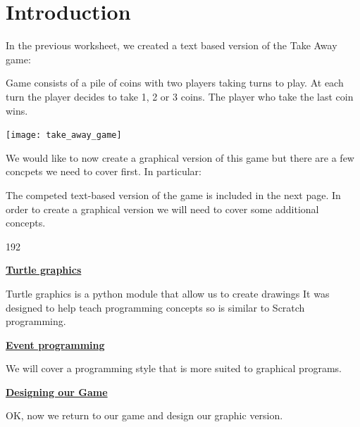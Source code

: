 \documentclass{coderdojo}
\begin{document}
\maketitle

\section*{Introduction}

In the previous worksheet, we created a text based version of the Take Away game:

\begin{exercise}[title=Take Away Game]
Game consists of a pile of coins with two players taking turns to play. At each turn the player decides to take 1, 2 or 3 coins.  The player who take the last coin wins.

\centerline {\texttt{[image: take\_away\_game]}}
\end{exercise}

We would like to now create a graphical version of this game but there are a few concpets we need to cover first. In particular:

The competed text-based version of the game is included in the next page. In order to create a graphical version we will need to cover some additional concepts.

\begin{dingautolist}{192}
\item \hyperref[sec:turtle]{\color{section}\bfseries Turtle graphics}

Turtle graphics is a python module that allow us to create drawings   It was designed to help teach 
programming concepts so is similar to Scratch programming. 

\item \hyperref[sec:event]{\color{section}\bfseries Event programming}

We will cover a programming style that is more suited to graphical programs.

\item \hyperref[sec:game]{\color{section}\bfseries  Designing our Game}

OK, now we return to our game and design our graphic version.


\end{dingautolist}

\end{document}
